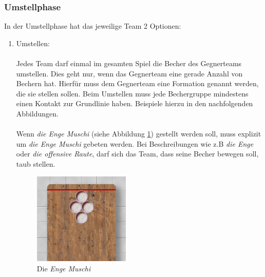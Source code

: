 \documentclass[a5paper, 12pt]{book}
\begin{document}
\subsubsection{Umstellphase}\label{umstellphase}
In der Umstellphase hat das jeweilige Team 2 Optionen:
\begin{enumerate}[(1)]
    \item Umstellen: \\\\
    Jedes Team darf einmal im gesamten Spiel die Becher des Gegnerteams umstellen. Dies geht nur, wenn das Gegnerteam eine gerade Anzahl von Bechern hat. Hierfür muss dem Gegnerteam eine Formation genannt werden, die sie stellen sollen. Beim Umstellen muss jede Bechergruppe mindestens einen Kontakt zur Grundlinie haben. Beispiele hierzu in den nachfolgenden Abbildungen.\\\\
Wenn \textit{die Enge Muschi} (siehe Abbildung \ref{fig:enge-Muschi}) gestellt werden soll, muss explizit um \textit{die Enge Muschi} gebeten werden. Bei Beschreibungen wie z.B \textit{die Enge} oder \textit{die offensive Raute}, darf sich das Team, dass seine Becher bewegen soll, taub stellen. \\
\begin{figure} 
    \includegraphics[width=0.434\textwidth]{enge_muschi.png}
    \caption{Die \textit{Enge Muschi}}
    \label{fig:enge-Muschi}
\end{figure}
\begin{figure}[h!]
     \centering
     \begin{subfigure}[b]{0.434\textwidth}
         \centering

\end{subfigure}
\end{figure}
\end{enumerate}
\end{document}
